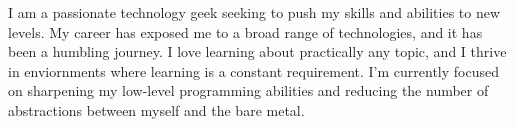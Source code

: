 \documentclass[9pt]{developercv} %
\begin{document}
\begin{minipage}[t]{0.4\textwidth} %
	\vspace{-\baselineskip} %
	
	\noindent
	I am a passionate technology geek seeking to push my skills and abilities to new levels. My 
	career has exposed me to a broad range of technologies, and it has been a humbling journey.
	I love learning about practically any topic, and I thrive in enviornments where learning is a constant requirement. I'm currently focused
	on sharpening my low-level programming abilities and reducing the number of abstractions between myself and the bare metal.\\ 
\end{minipage}
\hfill %
\begin{minipage}[t]{0.5\textwidth} %
	\vspace{-\baselineskip} %
	\begin{barchart}{5.5}
	\end{barchart}
\end{minipage}

\begin{center}
\end{center}


\end{document}
